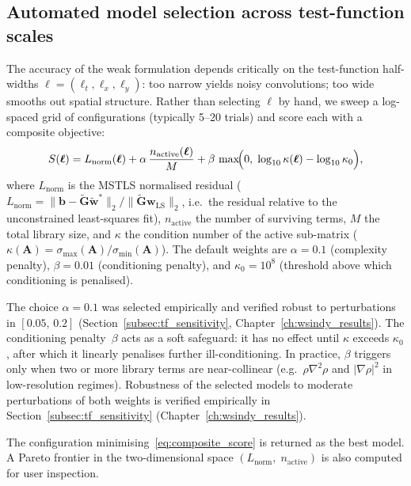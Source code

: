 \subsection{Automated model selection across test-function scales}
\label{subsec:model_selection}

The accuracy of the weak formulation depends critically on the test-function
half-widths $\boldsymbol\ell=(\ell_t,\ell_x,\ell_y)$: too narrow yields
noisy convolutions; too wide smooths out spatial structure.  Rather than
selecting $\boldsymbol\ell$ by hand, we sweep a log-spaced grid of
configurations (typically 5--20 trials) and score each with a composite
objective:
\begin{equation}
  S(\boldsymbol\ell)
  = L_{\mathrm{norm}}(\boldsymbol\ell)
  + \alpha\,\frac{n_{\mathrm{active}}(\boldsymbol\ell)}{M}
  + \beta\,\max\!\Bigl(0,\;
      \log_{10}\kappa(\boldsymbol\ell)
      - \log_{10}\kappa_0\Bigr),
  \label{eq:composite_score}
\end{equation}
where $L_{\mathrm{norm}}$ is the MSTLS normalised residual
($L_{\mathrm{norm}} = \lVert\mathbf{b} - \tilde{\mathbf{G}}\tilde{\mathbf{w}}^*\rVert_2
 / \lVert\tilde{\mathbf{G}}\mathbf{w}_{\mathrm{LS}}\rVert_2$,
i.e.\ the residual relative to the unconstrained least-squares fit),
$n_{\mathrm{active}}$ the number of surviving terms, $M$ the total library
size, and $\kappa$ the condition number of the active sub-matrix
($\kappa(\mathbf{A}) = \sigma_{\max}(\mathbf{A})/\sigma_{\min}(\mathbf{A})$).  The
default weights are $\alpha=0.1$ (complexity penalty), $\beta=0.01$
(conditioning penalty), and $\kappa_0=10^8$ (threshold above which
conditioning is penalised).

The choice $\alpha=0.1$ was selected empirically and verified
robust to perturbations in $[0.05,\,0.2]$
(Section~\ref{subsec:tf_sensitivity}, Chapter~\ref{ch:wsindy_results}).
The conditioning penalty~$\beta$ acts as a soft safeguard: it has no
effect until $\kappa$ exceeds $\kappa_0$, after which it linearly
penalises further ill-conditioning.  In practice, $\beta$ triggers only
when two or more library terms are near-collinear (e.g.\ $\rho\nabla^2\rho$
and $|\nabla\rho|^2$ in low-resolution regimes).  Robustness of the
selected models to moderate perturbations of both weights
is verified empirically in Section~\ref{subsec:tf_sensitivity}
(Chapter~\ref{ch:wsindy_results}).

The configuration minimising~\eqref{eq:composite_score} is returned as the
best model.  A Pareto frontier in the two-dimensional space
$(L_{\mathrm{norm}},\;n_{\mathrm{active}})$ is also computed for
user inspection.

